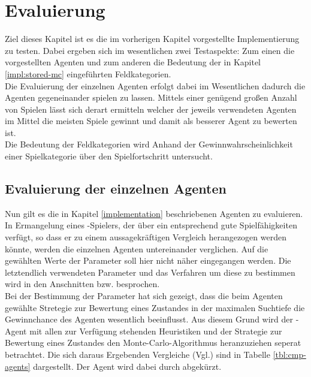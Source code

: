 \chapter{Evaluierung}
\authormax
Ziel dieses Kapitel ist es die im vorherigen Kapitel vorgestellte Implementierung zu testen. Dabei ergeben sich im wesentlichen zwei Testaspekte: Zum einen die vorgestellten Agenten und zum anderen die Bedeutung der in Kapitel \ref{impl:stored-mc} eingeführten Feldkategorien.
\vspace{0.5cm}
\\Die Evaluierung der einzelnen Agenten erfolgt dabei im Wesentlichen dadurch die Agenten gegeneinander spielen zu lassen. Mittels einer genügend großen Anzahl von Spielen lässt sich derart ermitteln welcher der jeweils verwendeten Agenten im Mittel die meisten Spiele gewinnt und damit als besserer Agent zu bewerten ist.
\\Die Bedeutung der Feldkategorien wird Anhand der Gewinnwahrscheinlichkeit einer Spielkategorie über den Spielfortschritt untersucht.
\section{Evaluierung der einzelnen Agenten}
\authormax
\label{cpt:eval-agents}
Nun gilt es die in Kapitel \ref{implementation} beschriebenen Agenten zu evaluieren. In Ermangelung eines \ot-Spielers, der über ein entsprechend gute Spielfähigkeiten verfügt, so dass er zu einem aussagekräftigen Vergleich herangezogen werden könnte, werden die einzelnen Agenten untereinander verglichen. Auf die gewählten Werte der Parameter soll hier nicht näher eingegangen werden. Die letztendlich verwendeten Parameter und das Verfahren um diese zu bestimmen wird in den Anschnitten  bzw.  besprochen.
\\Bei der Bestimmung der Parameter hat sich gezeigt, dass die beim Agenten \mxZitat{\abp} gewählte Stretegie zur Bewertung eines Zustandes in der maximalen Suchtiefe die Gewinnchance des Agenten wesentlich beeinflusst. Aus diesem Grund wird der \mxZitat{\abp}-Agent mit allen zur Verfügung stehenden Heuristiken und der Strategie zur Bewertung eines Zustandes den Monte-Carlo-Algorithmus heranzuziehen seperat betrachtet. Die sich daraus Ergebenden Vergleiche (Vgl.) sind in Tabelle \ref{tbl:cmp-agents} dargestellt. Der Agent \mxZitat{\abp} wird dabei durch  abgekürzt.

